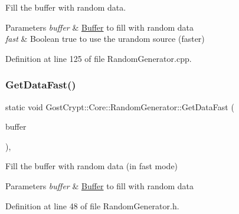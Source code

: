 Fill the buffer with random data. 


\begin{DoxyParams}{Parameters}
{\em buffer} & \hyperlink{class_gost_crypt_1_1_buffer}{Buffer} to fill with random data \\
\hline
{\em fast} & Boolean true to use the urandom source (faster) \\
\hline
\end{DoxyParams}


Definition at line 125 of file Random\+Generator.\+cpp.

\mbox{\label{class_gost_crypt_1_1_core_1_1_random_generator_a306aed1c1595e9503bc15bd177d80c54}} 
\subsubsection{\texorpdfstring{Get\+Data\+Fast()}{GetDataFast()}}
{\footnotesize\ttfamily static void Gost\+Crypt\+::\+Core\+::\+Random\+Generator\+::\+Get\+Data\+Fast (\begin{DoxyParamCaption}\item[{\hyperlink{class_gost_crypt_1_1_buffer_ptr}{Buffer\+Ptr} \&}]{buffer }\end{DoxyParamCaption})\hspace{0.3cm}{\ttfamily [inline]}, {\ttfamily [static]}}



Fill the buffer with random data (in fast mode) 


\begin{DoxyParams}{Parameters}
{\em buffer} & \hyperlink{class_gost_crypt_1_1_buffer}{Buffer} to fill with random data \\
\hline
\end{DoxyParams}


Definition at line 48 of file Random\+Generator.\+h.

\mbox{\label{class_gost_crypt_1_1_core_1_1_random_generator_a37750da5834d98eaed0a4f14a796716a}} 
